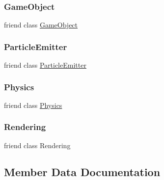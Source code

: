\subsubsection{\texorpdfstring{Game\+Object}{GameObject}}
{\footnotesize\ttfamily friend class \hyperlink{class_mason_1_1_game_object}{Game\+Object}\hspace{0.3cm}{\ttfamily [friend]}}

\hypertarget{class_mason_1_1_transform_a82b374d797a09668286ac5cf26f539f3}{}\label{class_mason_1_1_transform_a82b374d797a09668286ac5cf26f539f3} 
\subsubsection{\texorpdfstring{Particle\+Emitter}{ParticleEmitter}}
{\footnotesize\ttfamily friend class \hyperlink{class_mason_1_1_particle_emitter}{Particle\+Emitter}\hspace{0.3cm}{\ttfamily [friend]}}

\hypertarget{class_mason_1_1_transform_a2bfcbae6c8e1d7af93c5ac1200b1535c}{}\label{class_mason_1_1_transform_a2bfcbae6c8e1d7af93c5ac1200b1535c} 
\subsubsection{\texorpdfstring{Physics}{Physics}}
{\footnotesize\ttfamily friend class \hyperlink{class_mason_1_1_physics}{Physics}\hspace{0.3cm}{\ttfamily [friend]}}

\hypertarget{class_mason_1_1_transform_a33061a25b8332281d02c83e2bf1d4959}{}\label{class_mason_1_1_transform_a33061a25b8332281d02c83e2bf1d4959} 
\subsubsection{\texorpdfstring{Rendering}{Rendering}}
{\footnotesize\ttfamily friend class Rendering\hspace{0.3cm}{\ttfamily [friend]}}



\subsection{Member Data Documentation}
\hypertarget{class_mason_1_1_transform_aeb64a62787375e23645da6f490763c25}{}\label{class_mason_1_1_transform_aeb64a62787375e23645da6f490763c25} 
